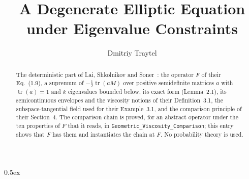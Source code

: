 \documentclass[11pt,a4paper]{article}
\begin{document}
\title{A Degenerate Elliptic Equation under Eigenvalue Constraints}
\author{Dmitriy Traytel}
\maketitle

\begin{abstract}
  The deterministic part of Lai, Shkolnikov and
  Soner~\cite{LaiShkolnikovSoner}: the operator $F$ of their Eq.~(1.9), a
  supremum of $-\frac12\operatorname{tr}(aM)$ over positive semidefinite
  matrices $a$ with $\operatorname{tr}(a)=1$ and $k$ eigenvalues bounded
  below, its exact form (Lemma~2.1), its semicontinuous envelopes and the
  viscosity notions of their Definition~3.1, the subspace-tangential field
  used for their Example~3.1, and the comparison principle of their
  Section~4.  The comparison chain is proved, for an abstract operator
  under the ten properties of $F$ that it reads, in
  \texttt{Geometric\_Viscosity\_Comparison}; this entry shows that $F$ has
  them and instantiates the chain at $F$. No probability theory is used.
\end{abstract}

\tableofcontents

\parindent 0pt\parskip 0.5ex





\end{document}
